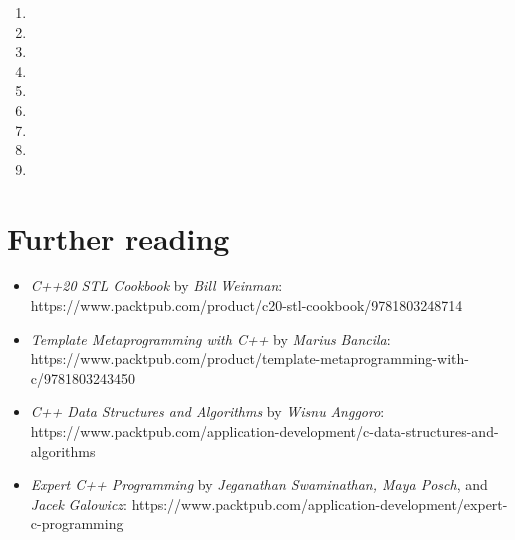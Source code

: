 \begin{enumerate}
\item
\item
\item
\item
\item
\item
\item
\item
\item
\end{enumerate}

\section{Further reading}

\begin{itemize}
\item
  \emph{C++20 STL Cookbook} by \emph{Bill} \emph{Weinman}: https://www.packtpub.com/product/c20-stl-cookbook/9781803248714
\item
  \emph{Template Metaprogramming with C++} by \emph{Marius} \emph{Bancila}: https://www.packtpub.com/product/template-metaprogramming-with-c/9781803243450
\item
  \emph{C++ Data Structures and Algorithms} by \emph{Wisnu} \emph{Anggoro}: https://www.packtpub.com/application-development/c-data-structures-and-algorithms
\item
  \emph{Expert C++ Programming} by \emph{Jeganathan Swaminathan, Maya Posch}, and \emph{Jacek} \emph{Galowicz}: https://www.packtpub.com/application-development/expert-c-programming
\end{itemize}


